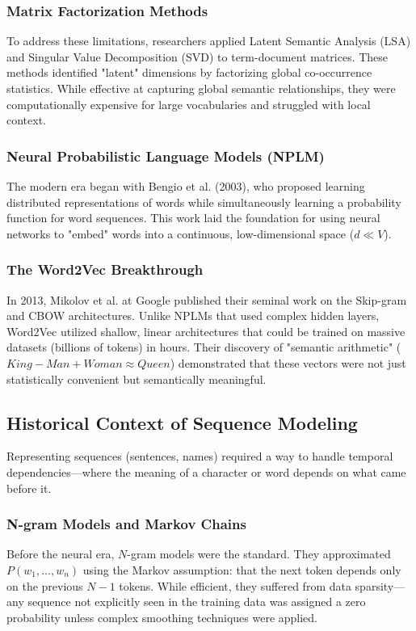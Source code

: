 \documentclass[12pt,a4paper]{article}
\begin{document}
\subsubsection{Matrix Factorization Methods}
To address these limitations, researchers applied Latent Semantic Analysis (LSA) and Singular Value Decomposition (SVD) to term-document matrices. These methods identified "latent" dimensions by factorizing global co-occurrence statistics. While effective at capturing global semantic relationships, they were computationally expensive for large vocabularies and struggled with local context.

\subsubsection{Neural Probabilistic Language Models (NPLM)}
The modern era began with Bengio et al. (2003), who proposed learning distributed representations of words while simultaneously learning a probability function for word sequences. This work laid the foundation for using neural networks to "embed" words into a continuous, low-dimensional space ($d \ll V$).

\subsubsection{The Word2Vec Breakthrough}
In 2013, Mikolov et al. at Google published their seminal work on the Skip-gram and CBOW architectures. Unlike NPLMs that used complex hidden layers, Word2Vec utilized shallow, linear architectures that could be trained on massive datasets (billions of tokens) in hours. Their discovery of "semantic arithmetic" ($King - Man + Woman \approx Queen$) demonstrated that these vectors were not just statistically convenient but semantically meaningful.

\subsection{Historical Context of Sequence Modeling}
Representing sequences (sentences, names) required a way to handle temporal dependencies—where the meaning of a character or word depends on what came before it.

\subsubsection{N-gram Models and Markov Chains}
Before the neural era, $N$-gram models were the standard. They approximated $P(w_1, \dots, w_n)$ using the Markov assumption: that the next token depends only on the previous $N-1$ tokens. While efficient, they suffered from data sparsity—any sequence not explicitly seen in the training data was assigned a zero probability unless complex smoothing techniques were applied.
\end{document}
